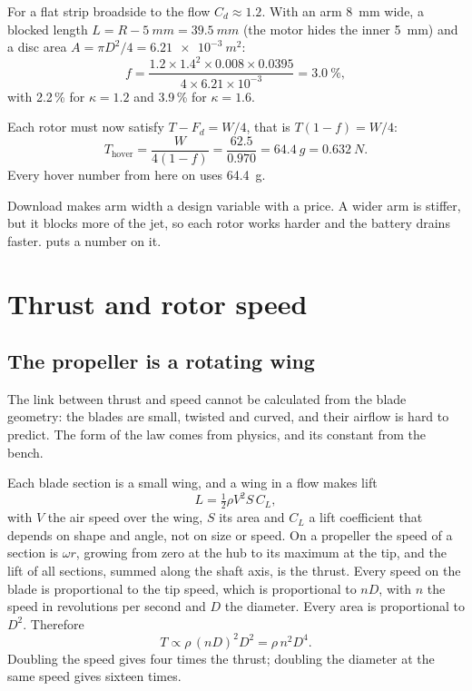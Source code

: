 For a flat strip broadside to the flow $C_d \approx 1.2$. With an arm \SI{8}{mm} wide, a blocked length $L = R - \SI{5}{mm} = \SI{39.5}{mm}$ (the motor hides the inner \SI{5}{mm}) and a disc area $A = \pi D^2/4 = \SI{6.21e-3}{m^2}$:
\begin{equation}
f = \frac{1.2 \times 1.4^2 \times 0.008 \times 0.0395}{4 \times 6.21 \times 10^{-3}} = \SI{3.0}{\percent},
\end{equation}
with 2.2\,\% for $\kappa = 1.2$ and 3.9\,\% for $\kappa = 1.6$.

Each rotor must now satisfy $T - F_d = W/4$, that is $T(1-f) = W/4$:
\begin{equation}
T_\text{hover} = \frac{W}{4(1-f)} = \frac{62.5}{0.970} = \SI{64.4}{g} = \SI{0.632}{N}.
\end{equation}
Every hover number from here on uses \SI{64.4}{g}.

Download makes arm width a design variable with a price. A wider arm is stiffer, but it blocks more of the jet, so each rotor works harder and the battery drains faster.  puts a number on it.

\section{Thrust and rotor speed}\label{sec:sizing-thrust}

\subsection{The propeller is a rotating wing}

The link between thrust and speed cannot be calculated from the blade geometry: the blades are small, twisted and curved, and their airflow is hard to predict. The form of the law comes from physics, and its constant from the bench.

Each blade section is a small wing, and a wing in a flow makes lift
\begin{equation}
L = \tfrac12 \rho V^2 S\, C_L,
\end{equation}
with $V$ the air speed over the wing, $S$ its area and $C_L$ a lift coefficient that depends on shape and angle, not on size or speed. On a propeller the speed of a section is $\omega r$, growing from zero at the hub to its maximum at the tip, and the lift of all sections, summed along the shaft axis, is the thrust. Every speed on the blade is proportional to the tip speed, which is proportional to $nD$, with $n$ the speed in revolutions per second and $D$ the diameter. Every area is proportional to $D^2$. Therefore
\begin{equation}
T \propto \rho\,(nD)^2 D^2 = \rho\, n^2 D^4.
\end{equation}
Doubling the speed gives four times the thrust; doubling the diameter at the same speed gives sixteen times.


